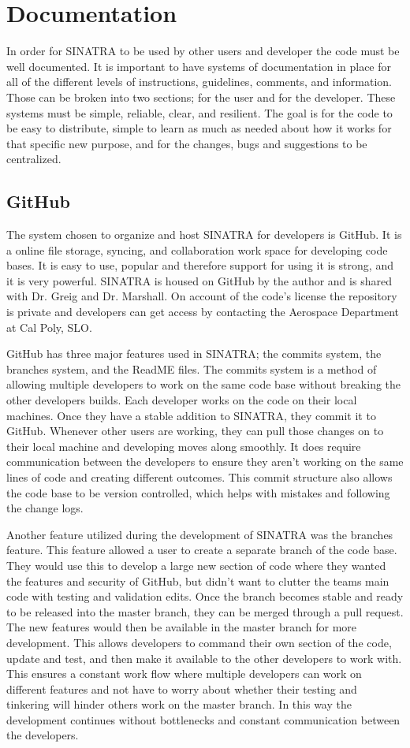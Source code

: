 \section{Documentation}
In order for SINATRA to be used by other users and developer the code must be well documented. It is important to have systems of documentation in place for all of the different levels of instructions, guidelines, comments, and information. Those can be broken into two sections; for the user and for the developer. These systems must be simple, reliable, clear, and resilient. The goal is for the code to be easy to distribute, simple to learn as much as needed about how it works for that specific new purpose, and for the changes, bugs and suggestions to be centralized.
\subsection{GitHub}
The system chosen to organize and host SINATRA for developers is GitHub. It is a online file storage, syncing, and collaboration work space for developing code bases. It is easy to use, popular and therefore support for using it is strong, and it is very powerful. SINATRA is housed on GitHub by the author and is shared with Dr. Greig and Dr. Marshall. On account of the code's license the repository is private and developers can get access by contacting the Aerospace Department at Cal Poly, SLO. \par
\indent GitHub has three major features used in SINATRA; the commits system, the branches system, and the ReadME files. The commits system is a method of allowing multiple developers to work on the same code base without breaking the other developers builds. Each developer works on the code on their local machines. Once they have a stable addition to SINATRA, they commit it to GitHub. Whenever other users are working, they can pull those changes on to their local machine and developing moves along smoothly. It does require communication between the developers to ensure they aren't working on the same lines of code and creating different outcomes. This commit structure also allows the code base to be version controlled, which helps with mistakes and following the change logs. \par
\indent Another feature utilized during the development of SINATRA was the branches feature. This feature allowed a user to create a separate branch of the code base. They would use this to develop a large new section of code where they wanted the features and security of GitHub, but didn't want to clutter the teams main code with testing and validation edits. Once the branch becomes stable and ready to be released into the master branch, they can be merged through a pull request. The new features would then be available in the master branch for more development. This allows developers to command their own section of the code, update and test, and then make it available to the other developers to work with. This ensures a constant work flow where multiple developers can work on different features and not have to worry about whether their testing and tinkering will hinder others work on the master branch. In this way the development continues without bottlenecks and constant communication between the developers. \par
